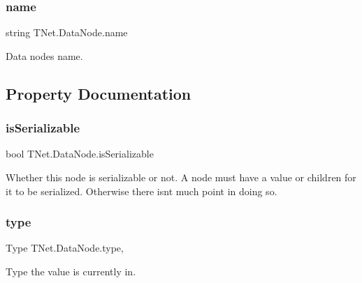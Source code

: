 \subsubsection{\texorpdfstring{name}{name}}
{\footnotesize\ttfamily string T\+Net.\+Data\+Node.\+name}



Data node\textquotesingle{}s name. 



\subsection{Property Documentation}
\mbox{\label{class_t_net_1_1_data_node_a1e69f98d665e5bd58a398fc88ec37763}} 
\subsubsection{\texorpdfstring{is\+Serializable}{isSerializable}}
{\footnotesize\ttfamily bool T\+Net.\+Data\+Node.\+is\+Serializable\hspace{0.3cm}{\ttfamily [get]}}



Whether this node is serializable or not. A node must have a value or children for it to be serialized. Otherwise there isn\textquotesingle{}t much point in doing so. 

\mbox{\label{class_t_net_1_1_data_node_a7a6d9db4eb81d226651ef3573655d975}} 
\subsubsection{\texorpdfstring{type}{type}}
{\footnotesize\ttfamily Type T\+Net.\+Data\+Node.\+type\hspace{0.3cm}{\ttfamily [get]}, {\ttfamily [set]}}



Type the value is currently in. 

\mbox{\label{class_t_net_1_1_data_node_ab1b718ef512ce7e5ebff5aa1a6c8e37b}} 
